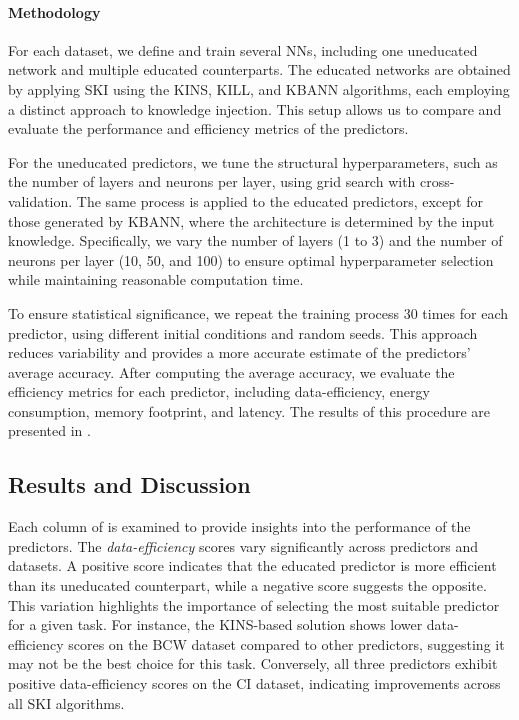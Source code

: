\paragraph{Methodology}
%
For each dataset, we define and train several \glspl{NN}, including one uneducated network and multiple educated counterparts.
%
The educated networks are obtained by applying \gls{SKI} using the \gls{KINS}, \gls{KILL}, and \gls{KBANN} algorithms, each employing a distinct approach to knowledge injection.
%
This setup allows us to compare and evaluate the performance and efficiency metrics of the predictors.

%
For the uneducated predictors, we tune the structural hyperparameters, such as the number of layers and neurons per layer, using grid search with cross-validation.
%
The same process is applied to the educated predictors, except for those generated by \gls{KBANN}, where the architecture is determined by the input knowledge.
%
Specifically, we vary the number of layers (1 to 3) and the number of neurons per layer (10, 50, and 100) to ensure optimal hyperparameter selection while maintaining reasonable computation time.

%
To ensure statistical significance, we repeat the training process 30 times for each predictor, using different initial conditions and random seeds.
%
This approach reduces variability and provides a more accurate estimate of the predictors' average accuracy.
%
After computing the average accuracy, we evaluate the efficiency metrics for each predictor, including data-efficiency, energy consumption, memory footprint, and latency.
%
The results of this procedure are presented in .


\subsection{Results and Discussion}\label{subsec:ski-meets-intelligent-agents-results-and-discussion}
%

%
Each column of  is examined to provide insights into the performance of the predictors.
%
The \emph{data-efficiency} scores vary significantly across predictors and datasets.
%
A positive score indicates that the educated predictor is more efficient than its uneducated counterpart, while a negative score suggests the opposite.
%
This variation highlights the importance of selecting the most suitable predictor for a given task.
%
For instance, the \gls{KINS}-based solution shows lower data-efficiency scores on the \gls{BCW} dataset compared to other predictors, suggesting it may not be the best choice for this task.
%
Conversely, all three predictors exhibit positive data-efficiency scores on the \gls{CI} dataset, indicating improvements across all \gls{SKI} algorithms.


